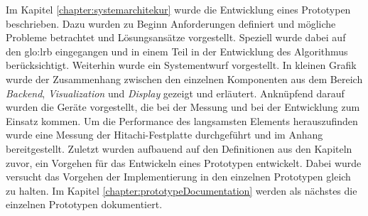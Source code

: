 Im Kapitel \ref{chapter:systemarchitekur} wurde die Entwicklung eines Prototypen beschrieben. Dazu wurden zu Beginn Anforderungen definiert und mögliche Probleme betrachtet und Lösungsansätze vorgestellt. Speziell wurde dabei auf den \gls{glo:lrb} eingegangen und in einem Teil in der Entwicklung des Algorithmus berücksichtigt. Weiterhin wurde ein Systementwurf vorgestellt. In kleinen Grafik wurde der Zusammenhang zwischen den einzelnen Komponenten aus dem Bereich \textit{Backend}, \textit{Visualization} und \textit{Display} gezeigt und erläutert. Anknüpfend darauf wurden die Geräte vorgestellt, die bei der Messung und bei der Entwicklung zum Einsatz kommen. Um die Performance des langsamsten Elements herauszufinden wurde eine Messung der Hitachi-Festplatte durchgeführt und im Anhang bereitgestellt. Zuletzt wurden aufbauend auf den Definitionen aus den Kapiteln zuvor, ein Vorgehen für das Entwickeln eines Prototypen entwickelt. Dabei wurde versucht das Vorgehen der Implementierung in den einzelnen Prototypen gleich zu halten. Im Kapitel \ref{chapter:prototypeDocumentation} werden als nächstes die einzelnen Prototypen dokumentiert.